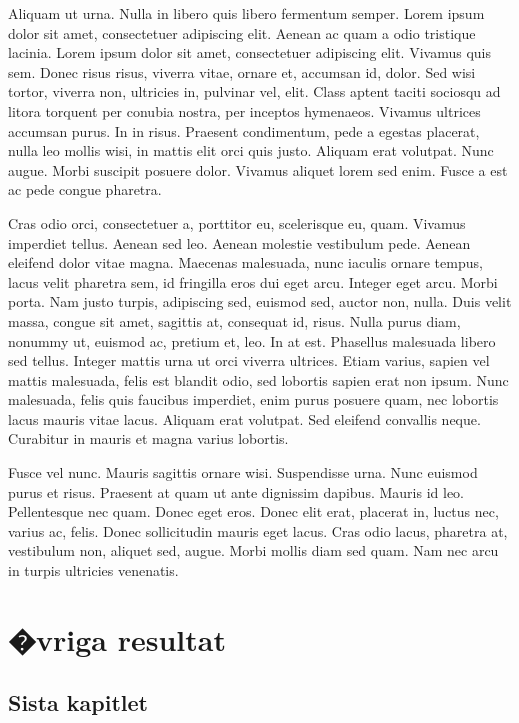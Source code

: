 \documentclass[a4paper,11pt]{kth-mag}
\begin{document}
Aliquam ut urna. Nulla in libero quis libero fermentum semper. Lorem
ipsum dolor sit amet, consectetuer adipiscing elit. Aenean ac quam a
odio tristique lacinia. Lorem ipsum dolor sit amet, consectetuer
adipiscing elit. Vivamus quis sem. Donec risus risus, viverra vitae,
ornare et, accumsan id, dolor. Sed wisi tortor, viverra non, ultricies
in, pulvinar vel, elit. Class aptent taciti sociosqu ad litora
torquent per conubia nostra, per inceptos hymenaeos. Vivamus ultrices
accumsan purus. In in risus. Praesent condimentum, pede a egestas
placerat, nulla leo mollis wisi, in mattis elit orci quis justo.
Aliquam erat volutpat. Nunc augue. Morbi suscipit posuere dolor.
Vivamus aliquet lorem sed enim. Fusce a est ac pede congue pharetra.

Cras odio orci, consectetuer a, porttitor eu, scelerisque eu, quam.
Vivamus imperdiet tellus. Aenean sed leo. Aenean molestie vestibulum
pede. Aenean eleifend dolor vitae magna. Maecenas malesuada, nunc
iaculis ornare tempus, lacus velit pharetra sem, id fringilla eros dui
eget arcu. Integer eget arcu. Morbi porta. Nam justo turpis,
adipiscing sed, euismod sed, auctor non, nulla. Duis velit massa,
congue sit amet, sagittis at, consequat id, risus. Nulla purus diam,
nonummy ut, euismod ac, pretium et, leo. In at est. Phasellus
malesuada libero sed tellus. Integer mattis urna ut orci viverra
ultrices. Etiam varius, sapien vel mattis malesuada, felis est blandit
odio, sed lobortis sapien erat non ipsum. Nunc malesuada, felis quis
faucibus imperdiet, enim purus posuere quam, nec lobortis lacus mauris
vitae lacus. Aliquam erat volutpat. Sed eleifend convallis neque.
Curabitur in mauris et magna varius lobortis.

Fusce vel nunc. Mauris sagittis ornare wisi. Suspendisse urna. Nunc
euismod purus et risus. Praesent at quam ut ante dignissim dapibus.
Mauris id leo. Pellentesque nec quam. Donec eget eros. Donec elit
erat, placerat in, luctus nec, varius ac, felis. Donec sollicitudin
mauris eget lacus. Cras odio lacus, pharetra at, vestibulum non,
aliquet sed, augue. Morbi mollis diam sed quam. Nam nec arcu in turpis
ultricies venenatis.

\part{�vriga resultat}

\chapter{Sista kapitlet}
\end{document}
